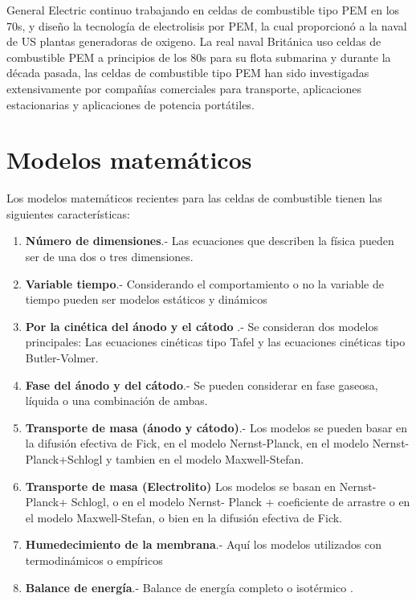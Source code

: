 \documentclass[12pt]{book}
\theoremstyle{definition}
\theoremstyle{remark}
\theoremstyle{plain}
\begin{document}
General Electric continuo trabajando en celdas de combustible tipo PEM en los 70s, y diseño
la tecnología de electrolisis por PEM, la cual proporcionó a la naval de US plantas 
generadoras de oxigeno. La real naval Británica uso celdas de combustible PEM a principios
de los 80s para su flota submarina y durante la década pasada, las celdas de combustible 
tipo PEM han sido investigadas extensivamente por compañías comerciales para transporte, 
aplicaciones estacionarias y aplicaciones de potencia portátiles.


\section{Modelos matemáticos}

Los modelos matemáticos recientes para las celdas de combustible tienen las siguientes características:

\begin{enumerate}
\item  \textbf{Número de dimensiones}.- Las ecuaciones que describen la física pueden ser de una dos o tres dimensiones.
\item \textbf{Variable tiempo}.- Considerando el comportamiento o no la variable de tiempo pueden ser modelos estáticos y dinámicos
\item  \textbf{Por la cinética del ánodo y el cátodo} .- Se consideran dos modelos principales: Las ecuaciones cinéticas tipo Tafel y las ecuaciones cinéticas tipo Butler-Volmer.
\item  \textbf{Fase del ánodo y del cátodo}.- Se pueden considerar en fase gaseosa, líquida o una combinación de ambas.

\item  \textbf{Transporte de masa (ánodo y cátodo)}.- Los modelos se pueden basar en la difusión efectiva de Fick, en el modelo Nernst-Planck, en el modelo Nernst-Planck+Schlogl y tambien en el modelo Maxwell-Stefan.

\item  \textbf{Transporte de masa (Electrolito)} Los modelos se basan en Nernst-Planck+ Schlogl, o en el modelo Nernst-
Planck + coeficiente de arrastre o en el modelo Maxwell-Stefan, o bien en  la difusión efectiva de Fick.

\item \textbf{Humedecimiento de la membrana}.- Aquí los modelos utilizados con termodinámicos o empíricos

\item \textbf{Balance de energía}.- Balance de energía completo o isotérmico \cite{Mase1999} .
\end{enumerate}
\end{document}
